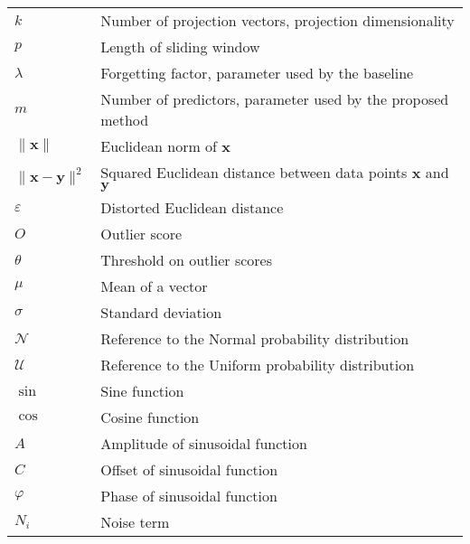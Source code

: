 \begin{table}[h]
\begin{tabular}{l l}
			$k$									&		Number of projection vectors, projection dimensionality\\
			$p$									& 		Length of sliding window\\
			$\lambda$							&		Forgetting factor, parameter used by the baseline\\		
			$m$									&		Number of predictors, parameter used by the proposed method\\			
			$\|{\mathbf x}\|$					&		Euclidean norm of ${\mathbf x}$\\
			$\|{\mathbf x} - {\mathbf y}\|^2$	&		Squared Euclidean distance between data points ${\mathbf x}$ and ${\mathbf y}$\\
			$\varepsilon$						&		Distorted Euclidean distance\\
			$O$									&		Outlier score\\		
			$\theta$							&		Threshold on outlier scores\\	
			$\mu$								&		Mean of a vector\\					
			$\sigma$							&		Standard deviation\\
			
			$\mathcal{N}$						&		Reference to the Normal probability distribution\\
			$\mathcal{U}$						&		Reference to the Uniform probability distribution\\
			$\sin$								&		Sine function\\
			$\cos$								&		Cosine function\\
			$A$									&		Amplitude of sinusoidal function\\
			$C$									&		Offset of sinusoidal function\\
			$\varphi$							&		Phase of sinusoidal function\\
			$N_i$								&		Noise term\\			

\end{tabular}
\end{table}

